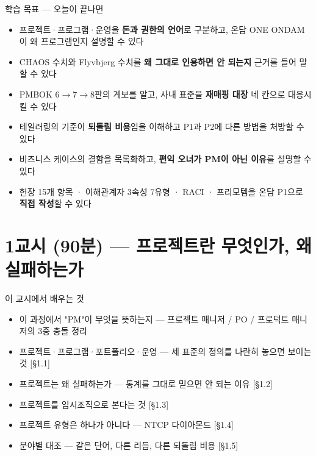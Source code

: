 \begin{frame}[allowframebreaks=1.0]{학습 목표 — 오늘이 끝나면}
\small
\begin{itemize}
\item\relax 프로젝트·프로그램·운영을 \textbf{돈과 권한의 언어}로 구분하고, 온담 ONE ONDAM이 왜 프로그램인지 설명할 수 있다
\item\relax CHAOS 수치와 Flyvbjerg 수치를 \textbf{왜 그대로 인용하면 안 되는지} 근거를 들어 말할 수 있다
\item\relax PMBOK 6$\rightarrow$7$\rightarrow$8판의 계보를 알고, 사내 표준을 \textbf{재매핑 대장} 네 칸으로 대응시킬 수 있다
\item\relax 테일러링의 기준이 \textbf{되돌림 비용}임을 이해하고 P1과 P2에 다른 방법을 처방할 수 있다
\item\relax 비즈니스 케이스의 결함을 목록화하고, \textbf{편익 오너가 PM이 아닌 이유}를 설명할 수 있다
\item\relax 헌장 15개 항목 · 이해관계자 3속성 7유형 · RACI · 프리모템을 온담 P1으로 \textbf{직접 작성}할 수 있다
\end{itemize}
\end{frame}

\section{1교시 (90분) — 프로젝트란 무엇인가, 왜 실패하는가}

\begin{frame}[allowframebreaks=1.0]{이 교시에서 배우는 것}
\small
\begin{itemize}
\item\relax 이 과정에서 "PM"이 무엇을 뜻하는지 — 프로젝트 매니저 / PO / 프로덕트 매니저의 3중 충돌 정리
\item\relax 프로젝트·프로그램·포트폴리오·운영 — 세 표준의 정의를 나란히 놓으면 보이는 것 [§1.1]
\item\relax 프로젝트는 왜 실패하는가 — 통계를 그대로 믿으면 안 되는 이유 [§1.2]
\item\relax 프로젝트를 임시조직으로 본다는 것 [§1.3]
\item\relax 프로젝트 유형은 하나가 아니다 — NTCP 다이아몬드 [§1.4]
\item\relax 분야별 대조 — 같은 단어, 다른 리듬, 다른 되돌림 비용 [§1.5]
\end{itemize}
\end{frame}

